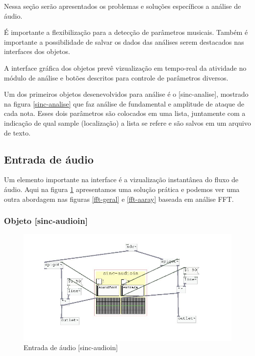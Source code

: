 \documentclass{ppgmus}
\begin{document}
Nessa seção serão apresentados os problemas e soluções específicos
a análise de áudio. 

É importante a flexibilização para a detecção de parâmetros musicais.
Também é importante a possibilidade de salvar os dados das análises serem
destacados nas interfaces dos objetos.

A interface gráfica dos objetos prevê vizualização em tempo-real
da atividade no módulo de análise e botões descritos para controle
de parâmetros diversos.

Um dos primeiros objetos desenevolvidos para análise é o [sinc-analise],
mostrado na figura \ref{sinc-analise} que faz análise de fundamental e amplitude
de ataque de cada nota. Esses dois parâmetros são colocados em uma lista, juntamente com a indicação
de qual sample (localização) a lista se refere e são salvos em um arquivo de texto.



\subsection{Entrada de áudio}

Um elemento importante na interface é a vizualização instantânea
do fluxo de áudio. Aqui na figura \ref{audioin} apresentamos uma solução prática e podemos
ver uma outra abordagem nas figuras \ref{fft-geral} e \ref{fft-aaray} baseada em análise FFT.

\subsubsection{Objeto [sinc-audioin]}


\begin{figure}[!htt]
\includegraphics[scale=.55]{audioin}
\caption{Entrada de áudio [sinc-audioin]}
\label{audioin}
\end{figure}
\end{document}
